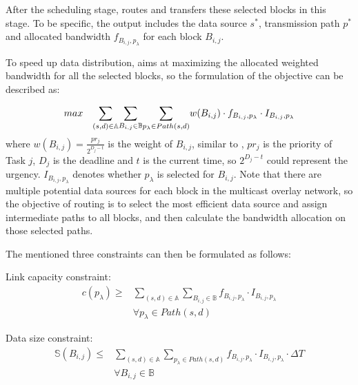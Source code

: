 After the scheduling stage, \name routes and transfers these selected blocks in this stage. To be specific, the output includes the data source $s^*$, transmission path $p^*$ and allocated bandwidth $f_{B_{i,j},p_\lambda}$ for each block $B_{i,j}$.

To speed up data distribution, \name aims at maximizing the allocated weighted bandwidth for all the selected blocks, so the formulation of the objective can be described as:

\begin{equation}
\centering
max \quad \displaystyle{\sum_{(s,d)\in \mathbb{A}}} \displaystyle{\sum_{B_{i,j} \in \mathbb{B}}} \displaystyle{\sum_{p_{\lambda}\in Path(s,d)}} w(B_{i,j})\cdot f_{B_{i,j},p_\lambda} \cdot I_{B_{i,j},p_\lambda}
\end{equation}
where $w(B_{i,j}) = \frac{pr_j}{2^{D_j-t}}$ is the weight of $B_{i,j}$, similar to \cite{zhang2015guaranteeing}, $pr_j$ is the priority of Task $j$, $D_j$ is the deadline and $t$ is the current time, so $2^{D_j-t}$ could represent the urgency. $I_{B_{i,j},p_\lambda}$ denotes whether $p_\lambda$ is selected for $B_{i,j}$. Note that there are multiple potential data sources for each block in the multicast overlay network, so the objective of routing is to select the most efficient data source and assign intermediate paths to all blocks, and then calculate the bandwidth allocation on those selected paths.

The mentioned three constraints can then be formulated as follows:

Link capacity constraint:
\begin{equation}
\begin{split}
c(p_\lambda) \geq & \displaystyle{\sum_{(s,d)\in \mathbb{A}}} \displaystyle{\sum_{B_{i,j} \in \mathbb{B}}} f_{B_{i,j},p_\lambda} \cdot I_{B_{i,j},p_\lambda}\\
& \forall p_\lambda \in Path(s,d) \label{st:capacity}
\end{split}
\end{equation}

Data size constraint:
\begin{equation}
\begin{split}
\mathbb{S}(B_{i,j}) \leq & \displaystyle{\sum_{(s,d)\in \mathbb{A}}} \displaystyle{\sum_{p_{\lambda}\in Path(s,d)}} f_{B_{i,j},p_\lambda} \cdot I_{B_{i,j},p_\lambda} \cdot \Delta T\\
& \forall B_{i,j} \in \mathbb{B} \label{st:size}\\
\end{split}
\end{equation}

